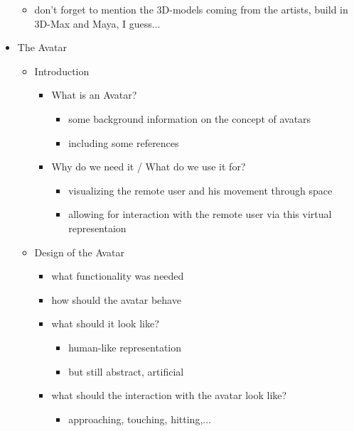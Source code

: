 \documentclass[conference]{acmsiggraph}
\begin{document}
\begin{itemize}
{\begin{itemize}
{		\begin{itemize}
		\item What is the CaveSceneManager?
		\item some references
		\item why do we use it / what do we need it for?
		\item how did we implement it?
		\end{itemize}
	}
	\item don't forget to mention the 3D-models coming from the artists, build in 3D-Max and Maya, I guess...
	\end{itemize}
}
\item{The Avatar
	\begin{itemize}
	\item{Introduction
		\begin{itemize}
		\item{What is an Avatar?
			\begin{itemize}
			\item some background information on the concept of avatars
			\item including some references
			\end{itemize}
		}
		\item{Why do we need it / What do we use it for?
			\begin{itemize}
			\item visualizing the remote user and his movement through space
			\item allowing for interaction with the remote user via this virtual representaion
			\end{itemize}
		}
		\end{itemize}			
	}
	\item{Design of the Avatar
		\begin{itemize}
		\item what functionality was needed
		\item how should the avatar behave
		\item{what should it look like?
			\begin{itemize}
			\item human-like representation
			\item but still abstract, artificial
			\end{itemize}
		}
		\item{what should the interaction with the avatar look like?
			\begin{itemize}
			\item approaching, touching, hitting,...

\end{itemize}}
\end{itemize}}
\end{itemize}}
\end{itemize}
\end{document}
